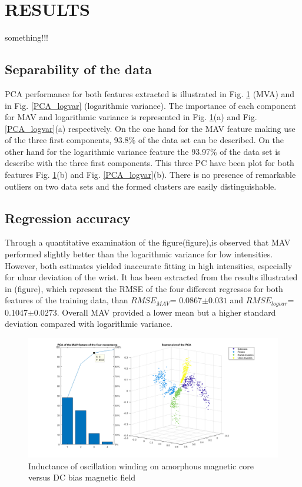 \documentclass[a4paper, 10pt, conference]{ieeeconf}      %
\begin{document}
	
	\section{RESULTS}
	
	something!!! 
	
	\subsection{Separability of the data} 
	PCA performance for both features extracted is illustrated in Fig. \ref{PCA_MVA} (MVA) and in Fig. \ref{PCA_logvar} (logarithmic variance).
	The importance of each component for MAV and logarithmic variance is represented in Fig. \ref{PCA_MVA}(a) and Fig. \ref{PCA_logvar}(a) respectively. On the one hand for the MAV feature making use of the three first components, 93.8\% of the data set can be described. On the other hand for the logarithmic variance feature the 93.97\% of the data set is describe with the three first components. This three PC have been plot for both features Fig. \ref{PCA_MVA}(b) and Fig. \ref{PCA_logvar}(b). There is no presence of remarkable outliers on two data sets and the formed clusters are easily distinguishable.


	\subsection{Regression accuracy} 
Through a quantitative examination of the figure(figure),is observed that MAV performed slightly better than the logarithmic variance for low intensities. However, both estimates yielded inaccurate fitting in high intensities, especially for ulnar deviation of the wrist. It has been extracted from the results illustrated in (figure), which represent the RMSE of the four different regressos for both features of the training data, than $RMSE_{MAV}$= 0.0867$\pm 0.031$ and $RMSE_{logvar}$= 0.1047$\pm 0.0273$. Overall MAV provided a lower mean but a higher standard deviation compared with logarithmic variance.

		\begin{figure}[thpb]
		\centering
		\includegraphics[scale=.27]{Figures/pcasubplotMAV}
		\caption{Inductance of oscillation winding on amorphous
			magnetic core versus DC bias magnetic field}
		\label{PCA_MVA}
	\end{figure}
\end{document}
